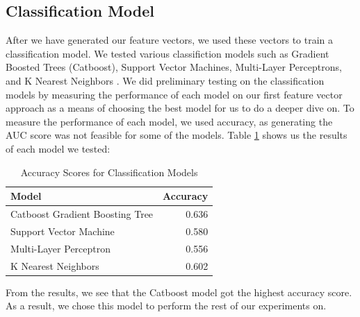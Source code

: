 \documentclass[10pt,twocolumn,letterpaper]{article}
\begin{document}
\subsection{Classification Model}
After we have generated our feature vectors, we used these vectors to train a classification model. We tested various classifiction models such as
Gradient Boosted Trees (Catboost), Support Vector Machines, Multi-Layer Perceptrons, and K Nearest Neighbors \cite{catboost}\cite{inproceedings}\cite{MURTAGH1991183}. We
did preliminary testing on the classification models by measuring the performance of each model on our first feature vector approach as a means of 
choosing the best model for us to do a deeper dive on. To measure the performance of each model, we used accuracy, as generating the AUC score was not 
feasible for some of the models. Table \ref{tab:table1} shows us the results of each model we tested:
\begin{table}[h]
  \begin{center}
    \caption{Accuracy Scores for Classification Models}
    \label{tab:table1}
    \begin{tabular}{l | r}
      \textbf{Model} & \textbf{Accuracy} \\
      \hline
      Catboost Gradient Boosting Tree & 0.636 \\
      Support Vector Machine & 0.580 \\
      Multi-Layer Perceptron & 0.556 \\
      K Nearest Neighbors & 0.602 \\
    \end{tabular}
  \end{center}
\end{table}

From the results, we see that the Catboost model got the highest accuracy score. As a result, we chose this model to perform the rest of our experiments on.


{\small


}
\end{document}
